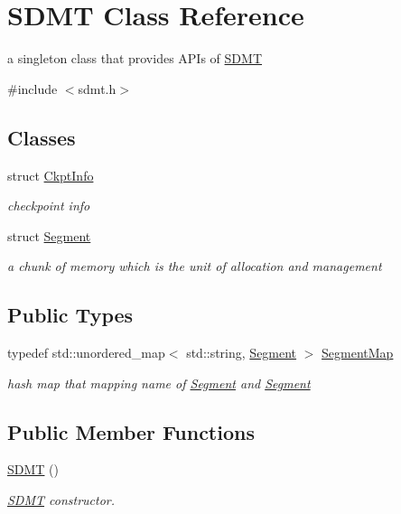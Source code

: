 \hypertarget{class_s_d_m_t}{}\section{S\+D\+MT Class Reference}
\label{class_s_d_m_t}


a singleton class that provides A\+P\+Is of \hyperlink{class_s_d_m_t}{S\+D\+MT}  




{\ttfamily \#include $<$sdmt.\+h$>$}

\subsection*{Classes}
\begin{DoxyCompactItemize}
\item 
struct \hyperlink{struct_s_d_m_t_1_1_ckpt_info}{Ckpt\+Info}
\begin{DoxyCompactList}\small\item\em checkpoint info \end{DoxyCompactList}\item 
struct \hyperlink{struct_s_d_m_t_1_1_segment}{Segment}
\begin{DoxyCompactList}\small\item\em a chunk of memory which is the unit of allocation and management \end{DoxyCompactList}\end{DoxyCompactItemize}
\subsection*{Public Types}
\begin{DoxyCompactItemize}
\item 
typedef std\+::unordered\+\_\+map$<$ std\+::string, \hyperlink{struct_s_d_m_t_1_1_segment}{Segment} $>$ \hyperlink{class_s_d_m_t_ab60c4624d197b2cf048ca65243d5bc53}{Segment\+Map}\hypertarget{class_s_d_m_t_ab60c4624d197b2cf048ca65243d5bc53}{}\label{class_s_d_m_t_ab60c4624d197b2cf048ca65243d5bc53}

\begin{DoxyCompactList}\small\item\em hash map that mapping name of \hyperlink{struct_s_d_m_t_1_1_segment}{Segment} and \hyperlink{struct_s_d_m_t_1_1_segment}{Segment} \end{DoxyCompactList}\end{DoxyCompactItemize}
\subsection*{Public Member Functions}
\begin{DoxyCompactItemize}
\item 
\hyperlink{class_s_d_m_t_a93fb108be06183e27b33ca23919c0ff9}{S\+D\+MT} ()\hypertarget{class_s_d_m_t_a93fb108be06183e27b33ca23919c0ff9}{}\label{class_s_d_m_t_a93fb108be06183e27b33ca23919c0ff9}

\begin{DoxyCompactList}\small\item\em \hyperlink{class_s_d_m_t}{S\+D\+MT} constructor. \end{DoxyCompactList}\end{DoxyCompactItemize}
